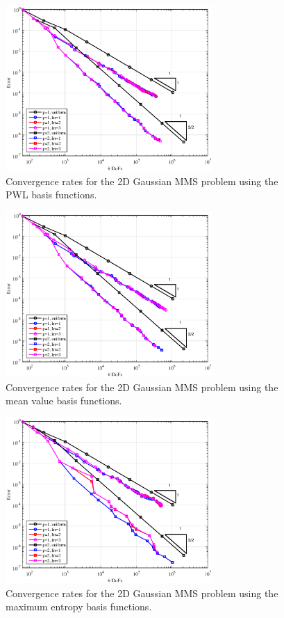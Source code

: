 \begin{figure}
\centering
\includegraphics[width=0.70\textwidth]{figures/sec_BF/TransportMMS_Gauss2D_PWL_Err.eps}
\caption{Convergence rates for the 2D Gaussian MMS problem using the PWL basis functions.}
\label{fig::BF_Results_MMS_Gauss2D_cart}
\end{figure}

\begin{figure}
\centering
\includegraphics[width=0.70\textwidth]{figures/sec_BF/TransportMMS_Gauss2D_MV_Err.eps}
\caption{Convergence rates for the 2D Gaussian MMS problem using the mean value basis functions.}
\label{fig::BF_Results_MMS_Gauss2D_tri}
\end{figure}

\begin{figure}
\centering
\includegraphics[width=0.70\textwidth]{figures/sec_BF/TransportMMS_Gauss2D_MAXENT_Err.eps}
\caption{Convergence rates for the 2D Gaussian MMS problem using the maximum entropy basis functions.}
\label{fig::BF_Results_MMS_Gauss2D_poly}
\end{figure}


